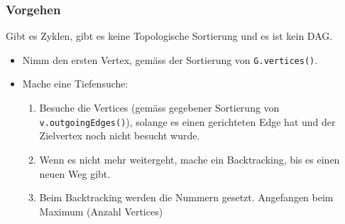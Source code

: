 \newpage

\subsubsection{Vorgehen}
Gibt es Zyklen, gibt es keine Topologische Sortierung und es ist kein DAG.
\begin{itemize}
	\item Nimm den ersten Vertex, gemäss der Sortierung von \lstinline|G.vertices()|.
	\item Mache eine Tiefensuche:
	\begin{enumerate}
		\item Besuche die Vertices (gemäss gegebener Sortierung von \lstinline|v.outgoingEdges()|), solange es einen gerichteten Edge hat und der Zielvertex noch nicht besucht wurde. 
		\item Wenn es nicht mehr weitergeht, mache ein Backtracking, bis es einen neuen Weg gibt. 
		\item Beim Backtracking werden die Nummern gesetzt. Angefangen beim Maximum (Anzahl Vertices)
	\end{enumerate}
\end{itemize}

